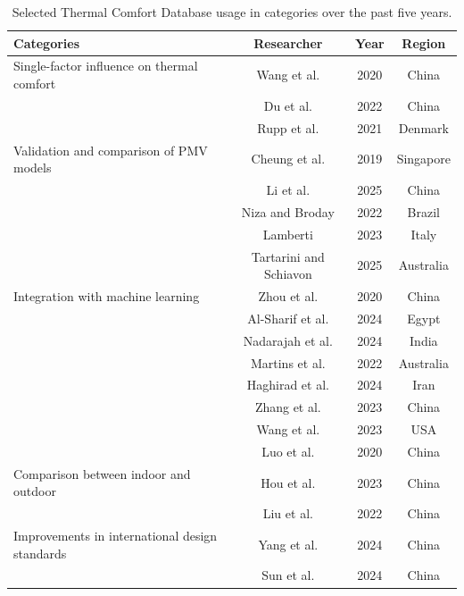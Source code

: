 \documentclass[final,3p,times,12pt]{elsarticle}
\begin{document}
\begin{table}[h!]
\centering
\renewcommand{\arraystretch}{1.1} %
\setlength{\tabcolsep}{2pt} %
\begin{tabular}{lccc}
\hline
\textbf{Categories} & \textbf{Researcher} & \textbf{Year} & \textbf{Region} \\ \hline
Single-factor influence on thermal comfort & Wang et al.\cite{wangRevisitingIndividualGroup2020a} & 2020 & China \\
& Du et al.\cite{duComparisonThermalComfort2022a} & 2022 & China \\ 
& Rupp et al.\cite{ruppInvestigatingCurrentTrends2021a} & 2021 & Denmark \\ 
Validation and comparison of PMV models & Cheung et al.\cite{cheungAnalysisAccuracyPMV2019}  & 2019 &Singapore \\
& Li et al.\cite{liModifiedPredictedMean2025}  & 2025 & China \\ 
& Niza and Broday\cite{lourenconizaThermalComfortConditions2022}  & 2022 & Brazil \\
& Lamberti\cite{lambertiDevelopmentComparisonAdaptive2023}  & 2023 & Italy \\
& Tartarini and Schiavon\cite{tartariniComparativeAnalysisPMV2025}  & 2025 & Australia \\
Integration with machine learning & Zhou et al. \cite{zhouDatadrivenThermalComfort2020} & 2020 & China\\ 
& Al-Sharif et al. \cite{al-sharifPredictingThermalPreferences2024} & 2024 & Egypt\\
& Nadarajah et al. \cite{nadarajahIdentificationApplicationBestsuited2024} & 2024 & India\\
& Martins et al. \cite{arakawamartinsSystematicReviewPersonal2022} & 2022 & Australia\\
& Haghirad et al. \cite{haghiradAdvancingPersonalThermal2024} & 2024 & Iran\\
& Zhang et al. \cite{zhangAnalysisOutlierDetection2023} & 2023 & China\\
& Wang et al. \cite{wangDimensionAnalysisSubjective2020a} & 2023 & USA\\
& Luo et al. \cite{luoComparingMachineLearning2020c} & 2020 & China\\
Comparison between indoor and outdoor & Hou et al. \cite{houTemporalSpatialHeterogeneity2023} & 2023 & China\\
& Liu et al. \cite{liuComparativeAnalysisIndoor2022a} & 2022 & China\\
Improvements in international design standards & Yang et al. \cite{yangComparativeAnalysisIndoor2024} & 2024 & China\\
& Sun et al.\cite{sunRevisitingAdaptiveThermal2024} & 2024 & China \\
\hline
\end{tabular}
\caption{Selected Thermal Comfort Database usage in categories over the past five years.}
\label{table 2}
\end{table}
\end{document}
